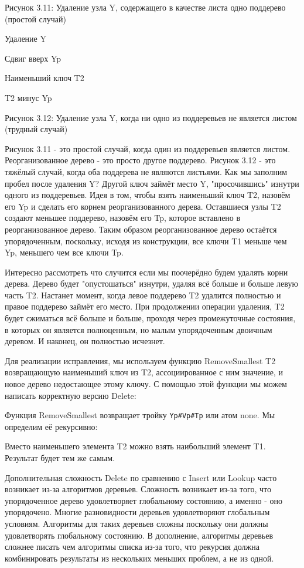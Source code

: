 Рисунок 3.11: Удаление узла Y, содержащего в качестве листа одно поддерево (простой случай)

Удаление Y

Сдвиг вверх Yp

Наименьший ключ T2

T2 минус Yp

Рисунок 3.12: Удаление узла Y, когда ни одно из поддеревьев не является листом (трудный случай)

Рисунок 3.11 - это простой случай, когда один из поддеревьев является листом. Реорганизованное дерево - это просто другое поддерево. Рисунок 3.12 - это тяжёлый случай, когда оба поддерева не являются листьями. Как мы заполним пробел после удаления Y? Другой ключ займёт место Y, "просочившись" изнутри одного из поддеревьев. Идея в том, чтобы взять наименьший ключ T2, назовём его Yp и сделать его корнем реорганизованного дерева. Оставшиеся узлы T2 создают меньшее поддерево, назовём его Tp, которое вставлено в реорганизованное дерево. Таким образом реорганизованное дерево остаётся упорядоченным, поскольку, исходя из конструкции, все ключи T1 меньше чем Yp, меньшего чем все ключи Tp.

Интересно рассмотреть что случится если мы поочерёдно будем удалять корни дерева. Дерево будет "опустошаться" изнутри, удаляя всё больше и больше левую часть T2. Настанет момент, когда левое поддерево T2 удалится полностью и правое поддерево займёт его место. При продолжении операции удаления, T2 будет сжиматься всё больше и больше, проходя через промежуточные состояния, в которых он является полноценным, но малым упорядоченным двоичным деревом. И наконец, он полностью исчезнет.

Для реализации исправления, мы используем функцию {RemoveSmallest T2} возвращающую наименьший ключ из T2, ассоциированное с ним значение, и новое дерево недостающее этому ключу. С помощью этой функции мы можем написать корректную версию Delete:

Функция RemoveSmallest возвращает тройку \verb|Yp#Vp#Tp| или атом none. Мы определим её рекурсивно:

Вместо наименьшего элемента T2 можно взять наибольший элемент T1. Результат будет тем же самым.

Дополнительная сложность Delete по сравнению с Insert или Lookup часто возникает из-за алгоритмов деревьев. Сложность возникает из-за того, что упорядоченное дерево удовлетворяет глобальному состоянию, а именно - оно упорядочено. Многие разновидности деревьев удовлетворяют глобальным условиям. Алгоритмы для таких деревьев сложны поскольку они должны удовлетворять глобальному состоянию. В дополнение, алгоритмы деревьев сложнее писать чем алгоритмы списка из-за того, что рекурсия должна комбинировать результаты из нескольких меньших проблем, а не из одной.

